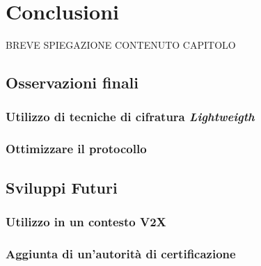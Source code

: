 \chapter{Conclusioni} %
%

\begin{citazione}
	BREVE SPIEGAZIONE CONTENUTO CAPITOLO
\end{citazione}

\section{Osservazioni finali}

\subsection{Utilizzo di tecniche di cifratura \emph{Lightweigth}}

\subsection{Ottimizzare il protocollo}

\section{Sviluppi Futuri}

\subsection{Utilizzo in un contesto V2X}

\subsection{Aggiunta di un'autorità di certificazione}



\newpage
